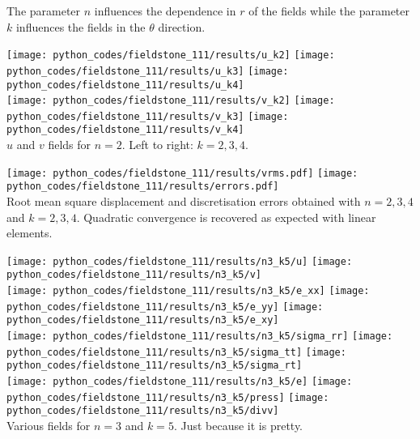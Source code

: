 The parameter $n$ influences the dependence in $r$ of the fields 
while the parameter $k$ influences the fields in the $\theta$ direction.

\newpage

\begin{center}
\texttt{[image: python\_codes/fieldstone\_111/results/u\_k2]}
\texttt{[image: python\_codes/fieldstone\_111/results/u\_k3]}
\texttt{[image: python\_codes/fieldstone\_111/results/u\_k4]}\\
\texttt{[image: python\_codes/fieldstone\_111/results/v\_k2]}
\texttt{[image: python\_codes/fieldstone\_111/results/v\_k3]}
\texttt{[image: python\_codes/fieldstone\_111/results/v\_k4]}\\
{\captionfont $u$ and $v$ fields for $n=2$. Left to right: $k=2,3,4$.}
\end{center}

\begin{center}
\texttt{[image: python\_codes/fieldstone\_111/results/vrms.pdf]}
\texttt{[image: python\_codes/fieldstone\_111/results/errors.pdf]}\\
{\captionfont Root mean square displacement and discretisation 
errors obtained with $n=2,3,4$ and $k=2,3,4$. Quadratic convergence 
is recovered as expected with linear elements.}
\end{center}

\newpage

\begin{center}
\texttt{[image: python\_codes/fieldstone\_111/results/n3\_k5/u]}
\texttt{[image: python\_codes/fieldstone\_111/results/n3\_k5/v]}\\
\texttt{[image: python\_codes/fieldstone\_111/results/n3\_k5/e\_xx]}
\texttt{[image: python\_codes/fieldstone\_111/results/n3\_k5/e\_yy]}
\texttt{[image: python\_codes/fieldstone\_111/results/n3\_k5/e\_xy]}\\
\texttt{[image: python\_codes/fieldstone\_111/results/n3\_k5/sigma\_rr]}
\texttt{[image: python\_codes/fieldstone\_111/results/n3\_k5/sigma\_tt]}
\texttt{[image: python\_codes/fieldstone\_111/results/n3\_k5/sigma\_rt]}\\
\texttt{[image: python\_codes/fieldstone\_111/results/n3\_k5/e]}
\texttt{[image: python\_codes/fieldstone\_111/results/n3\_k5/press]}
\texttt{[image: python\_codes/fieldstone\_111/results/n3\_k5/divv]}\\
{\captionfont Various fields for $n=3$ and $k=5$. Just because it is pretty.}
\end{center}


